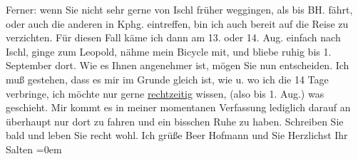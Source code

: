 \begin{ledgroupsized}[t]{13cm}
           \pstart
           Ferner: wenn Sie nicht sehr gerne von {\pb}Ischl früher weggingen, als bis BH. fährt, oder auch die anderen in Kphg.
               eintreffen, bin ich auch bereit auf die Reise zu verzichten. Für diesen Fall käme ich
               dann am 13. oder 14. Aug. einfach nach Ischl,
               ginge zum Leopold, nähme mein Bicycle mit, und
               bliebe ruhig bis 1. September dort. Wie es Ihnen angenehmer ist, mögen
               Sie nun entscheiden. Ich muß gestehen, dass es mir im Grunde gleich ist, wie u. wo
               ich die 14 Tage verbringe, ich möchte nur gerne \uline{rechtzeitig} wissen, (also bis 1. Aug.) was geschieht. Mir kommt es in meiner
               momentanen Verfassung lediglich darauf an überhaupt nur dort zu fahren und ein
               bisschen Ruhe zu haben. \pend
           \pstart
           Schreiben Sie bald und leben Sie recht wohl. Ich grüße Beer Hofmann und Sie \pend
           \pstart
           Herzlichst Ihr {\\[\baselineskip]}\spacefill\mbox{Salten}\pend
           \leftskip=0em{}
         
         \endnumbering{}\end{ledgroupsized}\begin{anhang}\end{anhang}\newcommand{\dateiname}{L03159}\newcommand{\titel}{Felix Salten an Arthur Schnitzler, 22. 7. 1895}\newcommand{\editorInnen}{Martin Anton Müller und Laura Untner}
      